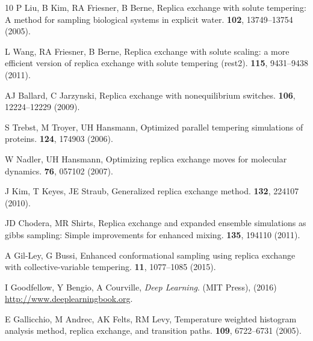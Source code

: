 \documentclass[9pt,twocolumn,twoside]{pnas-new}
\begin{document}
\begin{thebibliography}{10}
P Liu, B Kim, RA Friesner, B Berne, Replica exchange with solute tempering: A
  method for sampling biological systems in explicit water.
 \textbf{102}, 13749--13754 (2005).

L Wang, RA Friesner, B Berne, Replica exchange with solute scaling: a more
  efficient version of replica exchange with solute tempering (rest2).
  \textbf{115}, 9431--9438 (2011).

AJ Ballard, C Jarzynski, Replica exchange with nonequilibrium switches.
 \textbf{106}, 12224--12229 (2009).

S Trebst, M Troyer, UH Hansmann, Optimized parallel tempering simulations of
  proteins.
  \textbf{124}, 174903 (2006).

W Nadler, UH Hansmann, Optimizing replica exchange moves for molecular
  dynamics.
 \textbf{76}, 057102
  (2007).

J Kim, T Keyes, JE Straub, Generalized replica exchange method.
  \textbf{132}, 224107 (2010).

JD Chodera, MR Shirts, Replica exchange and expanded ensemble simulations as
  gibbs sampling: Simple improvements for enhanced mixing.
  \textbf{135}, 194110 (2011).

A Gil-Ley, G Bussi, Enhanced conformational sampling using replica exchange
  with collective-variable tempering.
 \textbf{11}, 1077--1085 (2015).

I Goodfellow, Y Bengio, A Courville, {\em Deep Learning}.
\newblock (MIT Press), (2016) \url{http://www.deeplearningbook.org}.

E Gallicchio, M Andrec, AK Felts, RM Levy, Temperature weighted histogram
  analysis method, replica exchange, and transition paths.
  \textbf{109}, 6722--6731 (2005).


\end{thebibliography}
\end{document}
